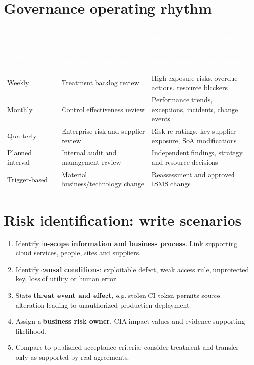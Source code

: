\documentclass[11pt,letterpaper]{article}
\begin{document}
\section{Governance operating rhythm}
\small{}\begin{longtable}{>{\raggedright\arraybackslash}p{}>{\raggedright\arraybackslash}p{}>{\raggedright\arraybackslash}p{}}
\rowcolor{navy} \textcolor{white}{\textbf{Cadence (example)}} & \textcolor{white}{\textbf{Meeting or activity}} & \textcolor{white}{\textbf{Required input and output}}\\
\endfirsthead
\rowcolor{navy} \textcolor{white}{\textbf{Cadence (example)}} & \textcolor{white}{\textbf{Meeting or activity}} & \textcolor{white}{\textbf{Required input and output}}\\
\endhead
Weekly & Treatment backlog review & High-exposure risks, overdue actions, resource blockers\\
Monthly & Control effectiveness review & Performance trends, exceptions, incidents, change events\\
Quarterly & Enterprise risk and supplier review & Risk re-ratings, key supplier exposure, SoA modifications\\
Planned interval & Internal audit and management review & Independent findings, strategy and resource decisions\\
Trigger-based & Material business/technology change & Reassessment and approved ISMS change\\
\end{longtable}\normalsize

\section{Risk identification: write scenarios}
\begin{enumerate}
\item Identify \textbf{in-scope information and business process}. Link supporting cloud services, people, sites and suppliers.
\item Identify \textbf{causal conditions}: exploitable defect, weak access rule, unprotected key, loss of utility or human error.
\item State \textbf{threat event and effect}, e.g. stolen CI token permits source alteration leading to unauthorized production deployment.
\item Assign a \textbf{business risk owner}, CIA impact values and evidence supporting likelihood.
\item Compare to published acceptance criteria; consider treatment and transfer only as supported by real agreements.
\end{enumerate}
\end{document}
